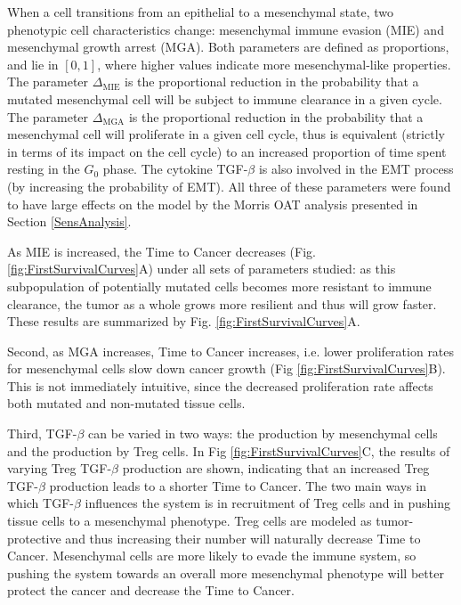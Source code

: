 \documentclass[11pt]{article}
\begin{document}
When a cell transitions from an epithelial to a mesenchymal state, two phenotypic cell characteristics change: mesenchymal immune evasion (MIE) and mesenchymal growth arrest (MGA).
Both parameters are defined as proportions, and lie in $[0,1]$, where higher values indicate more mesenchymal-like properties.
The parameter $\Delta_\text{MIE}$ is the proportional reduction in the probability that a mutated mesenchymal cell will be subject to immune clearance in a given cycle.
The parameter $\Delta_\text{MGA}$ is the proportional reduction in the probability that a mesenchymal cell will proliferate in a given cell cycle, thus is equivalent (strictly in terms of its impact on the cell cycle) to an increased proportion of time spent resting in the $G_0$ phase.
The cytokine TGF-$\beta$ is also involved in the EMT process (by increasing the probability of EMT). All three of these parameters were found to have large effects on the model by the Morris OAT analysis presented in Section \ref{SensAnalysis}.
\par 
As MIE is increased, the Time to Cancer decreases (Fig. \ref{fig:FirstSurvivalCurves}A) under all sets of parameters studied: as this subpopulation of potentially mutated cells becomes more resistant to immune clearance, the tumor as a whole grows more resilient and thus will grow faster.
These results are summarized by Fig. \ref{fig:FirstSurvivalCurves}A.

Second, as MGA increases, Time to Cancer increases, i.e. lower proliferation rates for mesenchymal cells slow down cancer growth (Fig \ref{fig:FirstSurvivalCurves}B).
This is not immediately intuitive, since the decreased proliferation rate affects both mutated and non-mutated tissue cells.

Third, TGF-$\beta$ can be varied in two ways: the production by mesenchymal cells and the production by Treg cells.
In Fig \ref{fig:FirstSurvivalCurves}C, the results of varying Treg TGF-$\beta$ production are shown, indicating that an increased Treg TGF-$\beta$ production leads to a shorter Time to Cancer.
The two main ways in which TGF-$\beta$ influences the system is in recruitment of Treg cells and in pushing tissue cells to a mesenchymal phenotype.
Treg cells are modeled as tumor-protective and thus increasing their number will naturally decrease Time to Cancer.
Mesenchymal cells are more likely to evade the immune system, so pushing the system towards an overall more mesenchymal phenotype will better protect the cancer and decrease the Time to Cancer.
\end{document}
